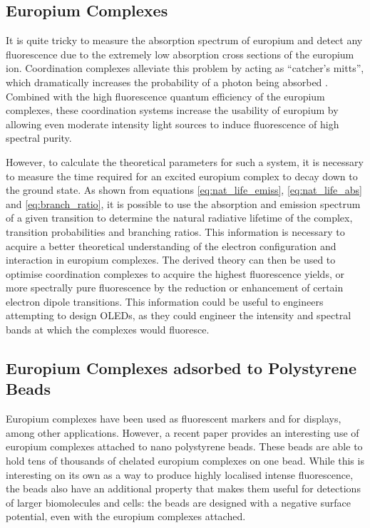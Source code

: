 \subsection{Europium Complexes}\label{subsec:eu_complex}

It is quite tricky to measure the absorption spectrum of europium and detect
any fluorescence due to the extremely low absorption cross sections of the
europium ion. Coordination complexes alleviate this problem by acting as
``catcher's mitts'', which dramatically increases the probability of a photon
being absorbed
\cite{Kirby:1983cl,Sveshnikova:2000cr,Werts:2002fs,Bunzli:2005ic,Moudam:2009in,Wilson:2010hs,Harma:2010dm,InstituteofBiomedicine:2011vt,Pihlasalo:2012cq}.
Combined with the high fluorescence quantum efficiency of the europium
complexes, these coordination systems increase the usability of europium by
allowing even moderate intensity light sources to induce fluorescence of high
spectral purity.

However, to calculate the theoretical parameters for such a system, it is
necessary to measure the time required for an excited europium complex to decay
down to the ground state. As shown from equations \eqref{eq:nat_life_emiss},
\eqref{eq:nat_life_abs} and \eqref{eq:branch_ratio}, it is possible to use the
absorption and emission spectrum of a given transition to determine the natural
radiative lifetime of the complex, transition probabilities and branching
ratios. This information is necessary to acquire a better theoretical
understanding of the electron configuration and interaction in europium
complexes. The derived theory can then be used to optimise coordination
complexes to acquire the highest fluorescence yields, or more spectrally pure
fluorescence by the reduction or enhancement of certain electron dipole
transitions. This information could be useful to engineers attempting to design
\acp{OLED}, as they could engineer the intensity and spectral bands at which
the complexes would fluoresce.



\subsection{Europium Complexes adsorbed to Polystyrene Beads}\label{subsec:eu_beads}

Europium complexes have been used as fluorescent markers and for displays,
among other applications. However, a recent paper provides an interesting use
of europium complexes attached to nano polystyrene beads. These beads are able
to hold tens of thousands of chelated europium complexes on one bead. While
this is interesting on its own as a way to produce highly localised intense
fluorescence, the beads also have an additional property that makes them useful
for detections of larger biomolecules and cells: the beads are designed with a
negative surface potential, even with the europium complexes attached.

